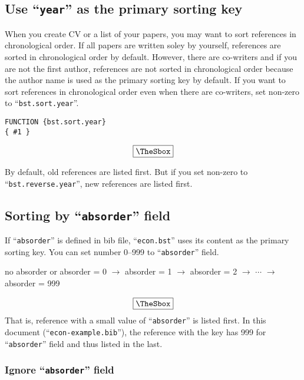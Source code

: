 \documentclass[10pt]{article}
\newenvironment{Frame}%
{\setlength{\fboxsep}{15pt}
\setlength{\mylength}{\linewidth}%
\addtolength{\mylength}{-2\fboxsep}%
\addtolength{\mylength}{-2\fboxrule}%
\Sbox
\minipage{\mylength}%
\setlength{\abovedisplayskip}{0pt}%
\setlength{\belowdisplayskip}{0pt}%
}%
{\endminipage\endSbox
\[\fbox{\TheSbox}\]}
\begin{document}
\subsection{Use ``\texttt{year}''  as the primary sorting key}

When you create CV or a list of your papers, you may want to sort
references in chronological order.  If all papers are written soley by
yourself, references are sorted in chronological order by default.
However, there are co-writers and if you are not the first author,
references are not sorted in chronological order because the author name
is used as the primary sorting key by default.
If you want to sort references in chronological order even when
there are co-writers, set non-zero to ``\texttt{bst.sort.year}''.
\begin{Frame}
\begin{verbatim}
FUNCTION {bst.sort.year}
{ #1 }
\end{verbatim}
\end{Frame}

By default, old references are listed first.  But if you set non-zero to
``\texttt{bst.reverse.year}'', new references are listed first.

\subsection{Sorting by ``\texttt{absorder}'' field}

If ``\texttt{absorder}'' is defined in bib file,
``\texttt{econ.bst}'' uses its content as the primary sorting key.
You can set number 0--999 to ``\texttt{absorder}'' field.

\begin{Frame}
\begin{center}
 no absorder or absorder = 0  $\rightarrow$ absorder = 1 $\rightarrow$ absorder = 2
 $\rightarrow$ $\cdots$ $\rightarrow$ absorder = 999
\end{center}
\end{Frame}
That is, reference with a small value of ``\texttt{absorder}'' is listed
first.  In this document (``\texttt{econ-example.bib}''), the reference
with the key \citet{takeda10:_cge_analy_welfar_effec_trade} has 999 for
``\texttt{absorder}'' field and thus listed in the last.


\subsubsection{Ignore ``\texttt{absorder}'' field}
\end{document}
